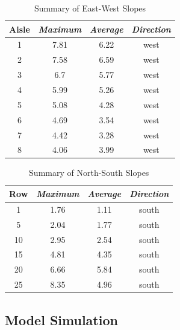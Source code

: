 \documentclass[conference]{IEEEtran}
\begin{document}
\begin{table}[htbp]
\caption{Summary of East-West Slopes}
\begin{center}
\begin{tabular}{|c|c|c|c|}
\hline
\textbf{Aisle} & \textbf{\textit{Maximum}}& \textbf{\textit{Average}}& \textbf{\textit{Direction}} \\
\hline
1& 7.81& 6.22& west \\
\hline
2& 7.58& 6.59& west \\
\hline
3& 6.7& 5.77& west \\
\hline
4&5.99& 5.26& west \\
\hline
5& 5.08& 4.28& west \\
\hline
6& 4.69& 3.54& west \\
\hline
7& 4.42& 3.28& west \\
\hline
8& 4.06& 3.99& west \\
\hline
\end{tabular}
\label{table:ew-slope-summary}
\end{center}
\end{table}

\begin{table}[htbp]
\caption{Summary of North-South Slopes}
\begin{center}
\begin{tabular}{|c|c|c|c|}
\hline
\textbf{Row} & \textbf{\textit{Maximum}}& \textbf{\textit{Average}}& \textbf{\textit{Direction}} \\
\hline
1&  1.76&  1.11& south \\
\hline
5&  2.04&  1.77& south \\
\hline
10& 2.95&  2.54& south \\
\hline
15& 4.81&  4.35& south \\
\hline
20& 6.66&  5.84& south \\
\hline
25& 8.35&  4.96& south \\
\hline
\end{tabular}
\label{table:row-slope-summary}
\end{center}
\end{table}

\subsection{Model Simulation}
\end{document}
